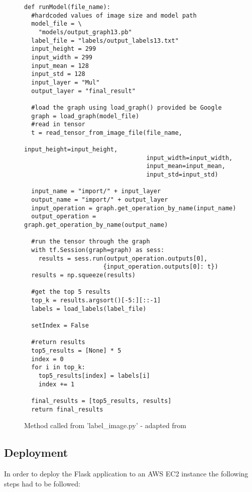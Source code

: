 \begin{figure}[h]
\caption{Method called from 'label\_image.py' - adapted from \parencite{retrainInception}}
\label{lst:labelBackend}
\begin{lstlisting}[style=Python]
def runModel(file_name):
  #hardcoded values of image size and model path
  model_file = \
    "models/output_graph13.pb"
  label_file = "labels/output_labels13.txt"
  input_height = 299
  input_width = 299
  input_mean = 128
  input_std = 128
  input_layer = "Mul"
  output_layer = "final_result"

  #load the graph using load_graph() provided be Google
  graph = load_graph(model_file)
  #read in tensor
  t = read_tensor_from_image_file(file_name,
                                  input_height=input_height,
                                  input_width=input_width,
                                  input_mean=input_mean,
                                  input_std=input_std)

  input_name = "import/" + input_layer
  output_name = "import/" + output_layer
  input_operation = graph.get_operation_by_name(input_name)
  output_operation = graph.get_operation_by_name(output_name)

  #run the tensor through the graph
  with tf.Session(graph=graph) as sess:
    results = sess.run(output_operation.outputs[0],
                      {input_operation.outputs[0]: t})
  results = np.squeeze(results)

  #get the top 5 results
  top_k = results.argsort()[-5:][::-1]
  labels = load_labels(label_file)

  setIndex = False

  #return results
  top5_results = [None] * 5
  index = 0
  for i in top_k:
    top5_results[index] = labels[i]
    index += 1

  final_results = [top5_results, results]
  return final_results
\end{lstlisting}
\end{figure}

\tocless\subsection{Deployment}
In order to deploy the Flask application to an AWS EC2 instance the following steps had to be followed:

